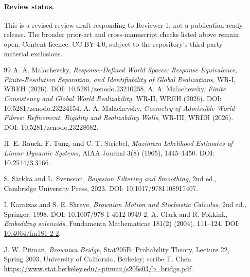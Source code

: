\documentclass[11pt]{article}
\begin{document}
\paragraph{Review status.}
This is a revised review draft responding to Reviewer 1, not a
publication-ready release.
The broader prior-art and cross-manuscript checks listed above remain
open. Content licence: CC BY 4.0, subject to the repository's
third-party-material exclusions.

\begin{thebibliography}{99}
 A. A. Malachevsky, \emph{Response-Defined World Spaces: Response Equivalence, Finite-Resolution Separation, and Identifiability of Global Realizations}, WR-I, WREH (2026). DOI: 10.5281/zenodo.23210258.
 A. A. Malachevsky, \emph{Finite Consistency and Global World Realizability}, WR-II, WREH (2026). DOI: 10.5281/zenodo.23224154.
 A. A. Malachevsky, \emph{Geometry of Admissible World Fibres: Refinement, Rigidity and Realizability Walls}, WR-III, WREH (2026). DOI: 10.5281/zenodo.23228682.

H. E. Rauch, F. Tung, and C. T. Striebel,
\emph{Maximum Likelihood Estimates of Linear Dynamic Systems},
AIAA Journal 3(8) (1965), 1445--1450.
DOI: 10.2514/3.3166.

S. S\"arkk\"a and L. Svensson,
\emph{Bayesian Filtering and Smoothing}, 2nd ed.,
Cambridge University Press, 2023.
DOI: 10.1017/9781108917407.

I. Karatzas and S. E. Shreve,
\emph{Brownian Motion and Stochastic Calculus}, 2nd ed.,
Springer, 1998.
DOI: 10.1007/978-1-4612-0949-2.
A. Clark and R. Fokkink,
\emph{Embedding solenoids},
Fundamenta Mathematicae 181(2) (2004), 111--124.
DOI: \href{https://doi.org/10.4064/fm181-2-2}{10.4064/fm181-2-2}.

J. W. Pitman, \emph{Brownian Bridge},
Stat205B: Probability Theory, Lecture 22, Spring 2003,
University of California, Berkeley; scribe T. Chen.
\url{https://www.stat.berkeley.edu/~pitman/s205s03/b_bridge.pdf}.
\end{thebibliography}
\end{document}
